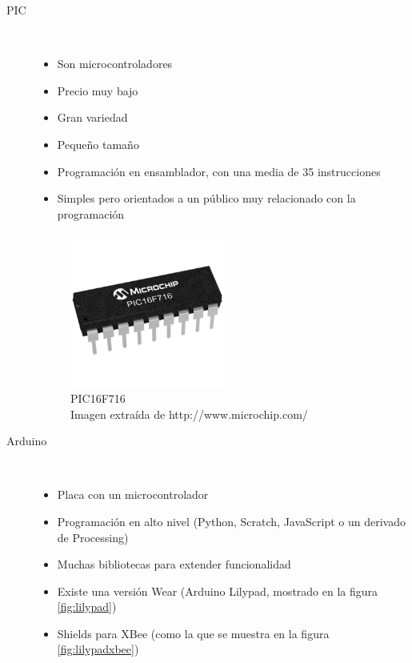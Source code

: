 \begin{description}
  \item[PIC] \hfill \\
    \begin{itemize}
      \item Son microcontroladores
      \item Precio muy bajo
      \item Gran variedad
      \item Pequeño tamaño
      \item Programación en ensamblador, con una media de 35 instrucciones
      \item Simples pero orientados a un público muy relacionado con la programación
    \end{itemize}
    \begin{figure}[!htb]
    \centering
    \includegraphics[width=0.5\textwidth]{./imagenes/pic}
    \caption{PIC16F716\\  \scriptsize{Imagen extraída de http://www.microchip.com/}} \label{fig:pic}
    \end{figure}
  \item[Arduino] \hfill \\
    \begin{itemize}
      \item Placa con un microcontrolador
      \item Programación en alto nivel (Python, Scratch, JavaScript o un derivado de Processing)
      \item Muchas bibliotecas para extender funcionalidad
      \item Existe una versión Wear (Arduino Lilypad, mostrado en la figura \ref{fig:lilypad})
      \item Shields para XBee (como la que se muestra en la figura \ref{fig:lilypadxbee})
    \end{itemize}
    \begin{figure}[!htb]

\end{figure}
\end{description}
